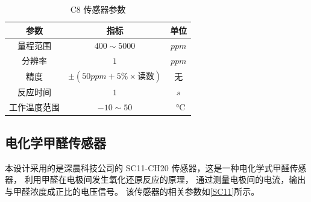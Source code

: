 \documentclass[12pt,hyperref,a4paper,UTF8]{ctexart}
\begin{document}
\begin{table}[htbp]
    \centering
    \caption{C8 传感器参数}
    \begin{tabular}{ccc}
        \toprule
        参数     & 指标                                    & 单位                  \\ \midrule
        量程范围   & $400\sim 5000 $                       & $ppm$               \\
        分辨率    & $1$                                   & $ppm$               \\
        精度     & $\pm (50ppm + 5\% \times \mbox{读数}) $ & 无                   \\
        反应时间   & $1$                                   & $s$                 \\
        工作温度范围 & $-10 \sim 50$                         & \SI{}\degreeCelsius \\
        \bottomrule
    \end{tabular}
    \label{C8}
\end{table}

\subsection{电化学甲醛传感器}
本设计采用的是深晨科技公司的 SC11-CH20 传感器，这是一种电化学式甲醛传感器，
利用甲醛在电极间发生氧化还原反应的原理，
通过测量电极间的电流，输出与甲醛浓度成正比的电压信号。
该传感器的相关参数如\autoref{SC11}所示。
\end{document}
